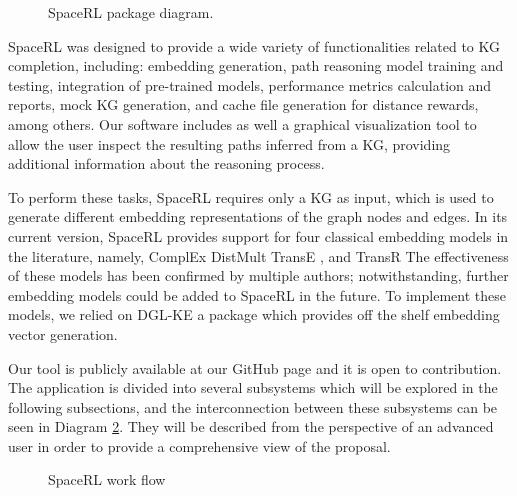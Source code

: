 \begin{figure}[!h]
    \centering
    
    \caption{SpaceRL package diagram.}
    \label{fig:classdiagram}
\end{figure}

SpaceRL was designed to provide a wide variety of functionalities related to KG completion, including: embedding generation, path reasoning model training and testing, integration of pre-trained models, performance metrics calculation and reports, mock KG generation, and cache file generation for distance rewards, among others. Our software includes as well a graphical visualization tool to allow the user inspect the resulting paths inferred from a KG, providing additional information about the reasoning process.

To perform these tasks, SpaceRL requires only a KG as input, which is used to generate different embedding representations of the graph nodes and edges. In its current version, SpaceRL provides support for four classical embedding models in the literature, namely, ComplEx 
DistMult 
TransE \cite{bordes2013translating}, and TransR 
The effectiveness of these models has been confirmed by multiple authors; notwithstanding, further embedding models could be added to SpaceRL in the future. To implement these models, we relied on DGL-KE 
a package which provides off the shelf embedding vector generation.

Our tool is publicly available at our GitHub page 
and it is open to contribution. The application is divided into several subsystems which will be explored in the following subsections, and the interconnection between these subsystems can be seen in Diagram \ref{fig:tool_flow}. They will be described from the perspective of an advanced user in order to provide a comprehensive view of the proposal.


\begin{figure}[htp]
    \centering
    
    \caption{SpaceRL work flow}
    \label{fig:tool_flow}
\end{figure}



